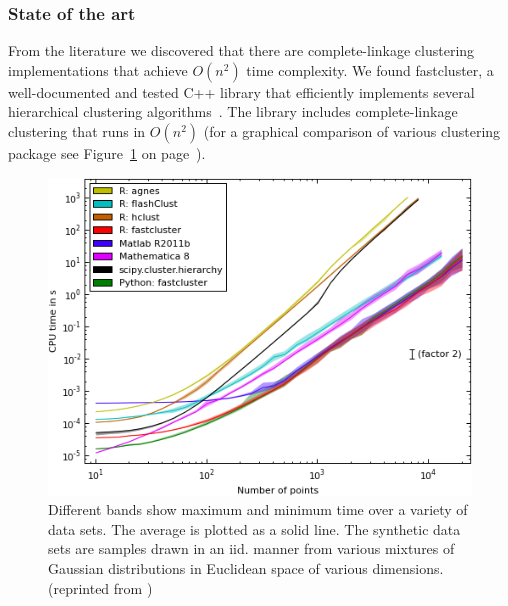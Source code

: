 \subsubsection*{State of the art}
From the literature we discovered that there are complete-linkage clustering implementations that achieve $O(n^2)$ time complexity.
We found fastcluster, a well-documented and tested C++ library that efficiently implements several hierarchical clustering algorithms~\cite{mullner2011modern, FastClust}.
The library includes complete-linkage clustering that runs in $O(n^2)$ (for a graphical comparison of various clustering package see Figure~\ref{fig:FastClustComparison} on page~\pageref{fig:FastClustComparison}).

\begin{figure}[h!]
\centering
\includegraphics[scale=0.75]{images/FastComplete-CH3}
\caption[Complete linkage clustering speed comparison between popular implementations.]{Different bands show maximum and minimum time over a variety of data sets. The average is plotted as a solid line. The synthetic data sets are samples drawn in an iid. manner from various mixtures of Gaussian distributions in Euclidean space of various dimensions.
(reprinted from \protect\cite{FastClust})}
\label{fig:FastClustComparison}
\end{figure}

